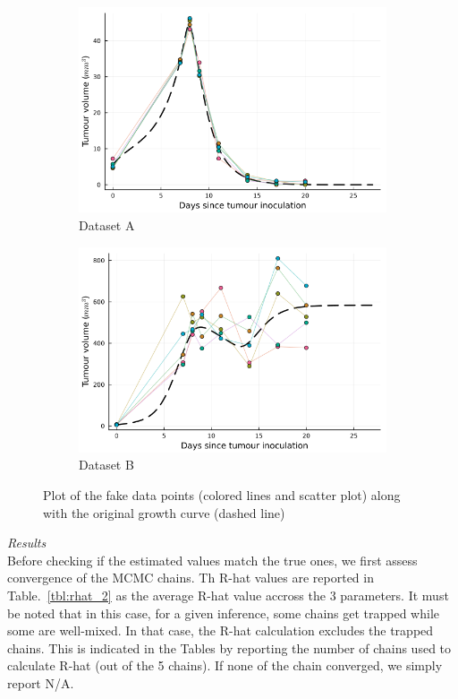 \documentclass[11pt]{article}
\begin{document}
\begin{figure}[!h]
    \centering
    \begin{subfigure}{.5\linewidth}
        \centering\includegraphics[scale=0.4]{fd_1.png}
        \caption{Dataset A}
    \end{subfigure}%
    \begin{subfigure}{.5\linewidth}
        \centering\includegraphics[scale=0.4]{fd_2.png}
        \caption{Dataset B}
    \end{subfigure}
    \caption{Plot of the fake data points (colored lines and scatter plot) along with the original growth curve (dashed line)}
    \label{fig:fd_1}
\end{figure}
\textit{Results}\\[5pt] 
Before checking if the estimated values match the true ones, we first assess convergence of the MCMC chains. Th R-hat values are reported in Table.~\ref{tbl:rhat_2} as the average R-hat value accross the 3 parameters. It must be noted that in this case, for a given inference, some chains get trapped while some are well-mixed. In that case, the R-hat calculation excludes the trapped chains. This is indicated in the Tables by reporting the number of chains used to calculate R-hat (out of the 5 chains). If none of the chain converged, we simply report N/A.
\end{document}
